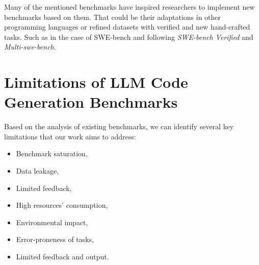 Many of the mentioned benchmarks have inspired researchers to implement new benchmarks based on them.
That could be their adaptations in other programming languages or refined datasets with verified and new hand-crafted tasks.
Such as in the case of SWE-bench and following \textit{SWE-bench Verified} and \textit{Multi-swe-bench}.




\section{Limitations of LLM Code Generation Benchmarks}



Based on the analysis of existing benchmarks, we can identify several key limitations that our work aims to address:
\begin{itemize}
    \item Benchmark saturation,
    \item Data leakage,
    \item Limited feedback,
    \item High resources' consumption,
    \item Environmental impact,
    \item Error-proneness of tasks,
    \item Limited feedback and output.
\end{itemize}

